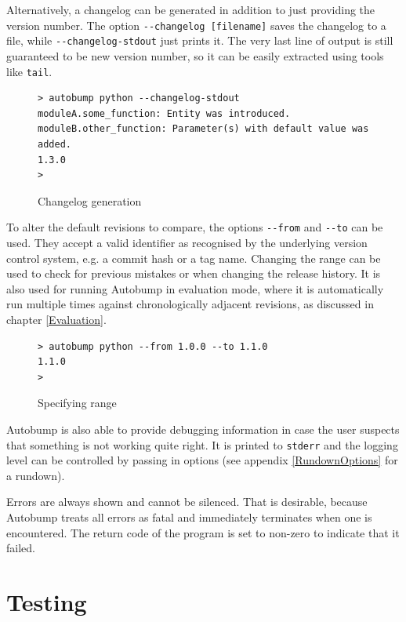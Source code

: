 \documentclass{l4proj}
\newcommand\genericstyle{\lstset{basicstyle=\ttm}}
\newcommand\codeinline[1]{{\genericstyle\lstinline!#1!}}
\begin{document}
Alternatively, a changelog can be generated in addition to just
providing the version number. The option \codeinline{--changelog
[filename]} saves the changelog to a file, while
\codeinline{--changelog-stdout} just prints it. The very last line of
output is still guaranteed to be new version number, so it can be
easily extracted using tools like \codeinline{tail}.

\begin{figure}[H]
\centering
\caption{Changelog generation}
\begin{BVerbatim}
> autobump python --changelog-stdout
moduleA.some_function: Entity was introduced.
moduleB.other_function: Parameter(s) with default value was added.
1.3.0
>
\end{BVerbatim}
\end{figure}

To alter the default revisions to compare, the options
\codeinline{--from} and \codeinline{--to} can be used. They accept a
valid identifier as recognised by the underlying version control
system, e.g. a commit hash or a tag name. Changing the range can be
used to check for previous mistakes or when changing the release
history. It is also used for running Autobump in evaluation mode,
where it is automatically run multiple times against chronologically
adjacent revisions, as discussed in chapter \ref{Evaluation}.

\begin{figure}[H]
\centering
\caption{Specifying range}
\begin{BVerbatim}
> autobump python --from 1.0.0 --to 1.1.0
1.1.0
>
\end{BVerbatim}
\end{figure}

Autobump is also able to provide debugging information in case the
user suspects that something is not working quite right. It is printed
to \codeinline{stderr} and the logging level can be controlled by
passing in options (see appendix \ref{RundownOptions} for a rundown).

Errors are always shown and cannot be silenced. That is desirable,
because Autobump treats all errors as fatal and immediately terminates
when one is encountered. The return code of the program is set to
non-zero to indicate that it failed.

\chapter{Testing}
\label{Testing}
\end{document}
